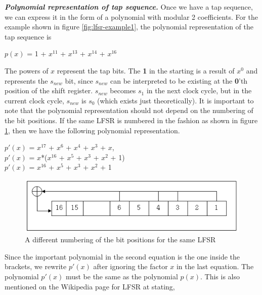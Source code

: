 \noindent \textit{\textbf{Polynomial representation of tap sequence.}} Once we have a tap sequence, we can express it in the form of a polynomial with modular 2 coefficients. For the example shown in figure \ref{fig:lfsr-example1}, the polynomial representation of the tap sequence is

\begin{center}
$p(x)$ =  1 + $x^{11}$ + $x^{13}$ + $x^{14}$ + $x^{16}$
\end{center}

The powers of $x$ represent the tap bits. The \textbf{1} in the starting is a result of $x^0$ and represents the $s_{new}$ bit, since $s_{new}$ can be interpreted to be existing at the \textbf{0}'th position of the shift register. $s_{new}$ becomes $s_1$ in the next clock cycle, but in the current clock cycle, $s_{new}$ is $s_0$ (which exists just theoretically). It is important to note that the polynomial representation should not depend on the numbering of the bit positions. If the same LFSR is numbered in the fashion as shown in figure \ref{fig:lfsr-example2}, then we have the following polynomial representation.

\begin{center}
$p'(x)$ = $x^{17}$ + $x^{6}$ + $x^{4}$ + $x^{3}$ + $x$,\\
$p'(x)$ = $x$*($x^{16}$ + $x^{5}$ + $x^{3}$ + $x^{2}$ + 1)\\
$p'(x)$ = $x^{16}$ + $x^{5}$ + $x^{3}$ + $x^{2}$ + 1
\end{center}

\begin{figure}[ht!]
	\centering
		\includegraphics[width=5in]{./figures/lfsr-example-reverse.PNG}
	\caption{A different numbering of the bit positions for the same LFSR}	
	\label{fig:lfsr-example2}
\end{figure}

Since the important polynomial in the second equation is the one inside the brackets, we rewrite $p'(x)$ after ignoring the factor $x$ in the last equation. The polynomial $p'(x)$ must be the same as the polynomial $p(x)$. This is also mentioned on the Wikipedia page for LFSR at \cite{lfsr-wiki} stating,

